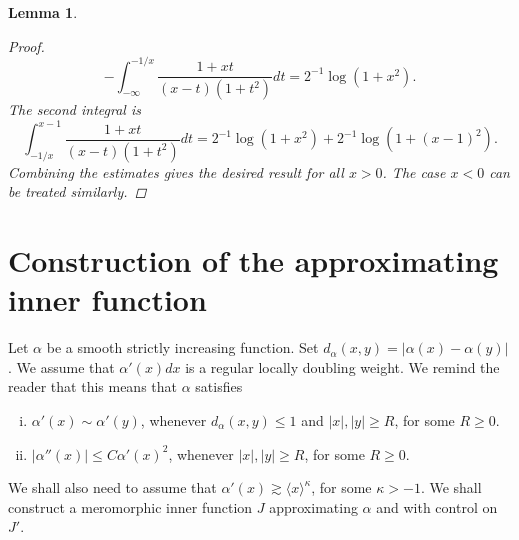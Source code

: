 \documentclass{article}[12pt]
\newtheorem{lemma}{Lemma}
\theoremstyle{remark}
\begin{document}
\begin{lemma}
\begin{proof}
                \begin{equation*}
                    -\int_{-\infty}^{-1/x} \frac{1+xt}{(x-t)(1+t^{2})}dt = 2^{-1}\log (1+x^{2}).
                \end{equation*}
                The second integral is
                \begin{equation*}
                    \int_{-1/x}^{x-1} \frac{1+xt}{(x-t)(1+t^{2})}dt = 2^{-1}\log\left( 1+x^{2}\right) + 2^{-1}\log(1+(x-1)^{2}).
                \end{equation*}
                Combining the estimates gives the desired result for all $x > 0$. The case $x < 0$ can be treated similarly.
            \end{proof}
        \end{lemma}
        
\section{Construction of the approximating inner function}

    Let $\alpha$ be a smooth strictly increasing function. Set $d_{\alpha}(x,y) =\lvert \alpha(x)-\alpha(y) \rvert$. We assume that $\alpha'(x)dx$ is a regular locally doubling weight. We remind the reader that this means that $\alpha$ satisfies
    \begin{enumerate}[(i)]
        \item $\alpha'(x) \sim \alpha'(y)$, whenever $d_{\alpha}(x,y) \leq 1$ and $\lvert x \rvert, \lvert y \rvert \geq R$, for some $R \geq 0$.
        \item $\lvert \alpha''(x) \rvert \leq C\alpha'(x)^{2}$, whenever $\lvert x \rvert, \lvert y \rvert \geq R$, for some $R \geq 0$.
    \end{enumerate}
    We shall also need to assume that $\alpha'(x) \gtrsim \langle x \rangle^{\kappa}$, for some $\kappa > -1$. We shall construct a meromorphic inner function $J$ approximating $\alpha$ and with control on $J'$.
\end{document}
